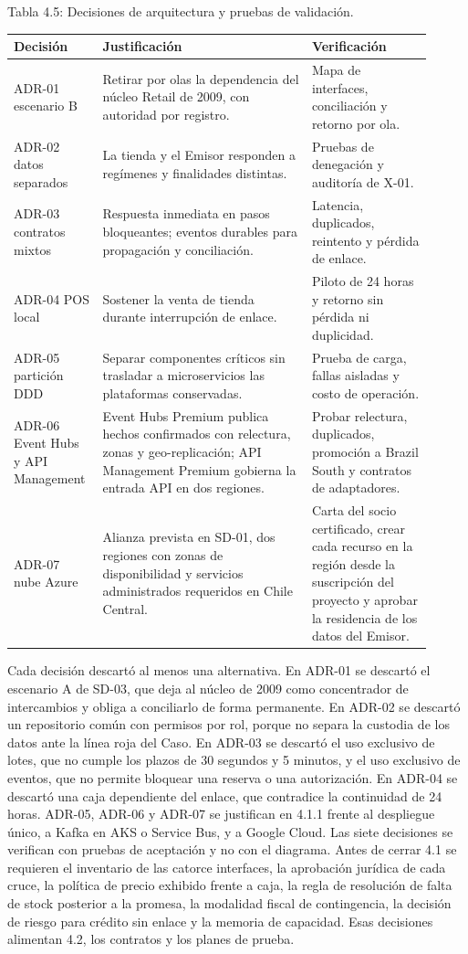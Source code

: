 \documentclass[11pt]{article}
\begin{document}
Tabla 4.5: Decisiones de arquitectura y pruebas de validación.

\begin{longtable}{@{}p{0.17\linewidth}p{0.47\linewidth}p{0.27\linewidth}@{}}
\toprule Decisión & Justificación & Verificación \\
\midrule\endhead\bottomrule\endlastfoot
ADR-01 escenario B & Retirar por olas la dependencia del núcleo Retail de 2009, con autoridad por registro. & Mapa de interfaces, conciliación y retorno por ola. \\
ADR-02 datos separados & La tienda y el Emisor responden a regímenes y finalidades distintas. & Pruebas de denegación y auditoría de X-01. \\
ADR-03 contratos mixtos & Respuesta inmediata en pasos bloqueantes; eventos durables para propagación y conciliación. & Latencia, duplicados, reintento y pérdida de enlace. \\
ADR-04 POS local & Sostener la venta de tienda durante interrupción de enlace. & Piloto de 24 horas y retorno sin pérdida ni duplicidad. \\
ADR-05 partición DDD & Separar componentes críticos sin trasladar a microservicios las plataformas conservadas. & Prueba de carga, fallas aisladas y costo de operación. \\
ADR-06 Event Hubs y API Management & Event Hubs Premium publica hechos confirmados con relectura, zonas y geo-replicación; API Management Premium gobierna la entrada API en dos regiones. & Probar relectura, duplicados, promoción a Brazil South y contratos de adaptadores. \\
ADR-07 nube Azure & Alianza prevista en SD-01, dos regiones con zonas de disponibilidad y servicios administrados requeridos en Chile Central. & Carta del socio certificado, crear cada recurso en la región desde la suscripción del proyecto y aprobar la residencia de los datos del Emisor. \\
\end{longtable}

Cada decisión descartó al menos una alternativa. En ADR-01 se descartó el escenario A de SD-03, que deja al núcleo de 2009 como concentrador de intercambios y obliga a conciliarlo de forma permanente. En ADR-02 se descartó un repositorio común con permisos por rol, porque no separa la custodia de los datos ante la línea roja del Caso. En ADR-03 se descartó el uso exclusivo de lotes, que no cumple los plazos de 30 segundos y 5 minutos, y el uso exclusivo de eventos, que no permite bloquear una reserva o una autorización. En ADR-04 se descartó una caja dependiente del enlace, que contradice la continuidad de 24 horas. ADR-05, ADR-06 y ADR-07 se justifican en 4.1.1 frente al despliegue único, a Kafka en AKS o Service Bus, y a Google Cloud. Las siete decisiones se verifican con pruebas de aceptación y no con el diagrama. Antes de cerrar 4.1 se requieren el inventario de las catorce interfaces, la aprobación jurídica de cada cruce, la política de precio exhibido frente a caja, la regla de resolución de falta de stock posterior a la promesa, la modalidad fiscal de contingencia, la decisión de riesgo para crédito sin enlace y la memoria de capacidad. Esas decisiones alimentan 4.2, los contratos y los planes de prueba.
\end{document}
